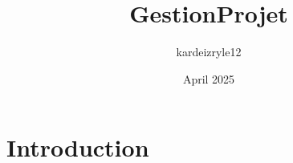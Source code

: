 \documentclass{article}
\title{GestionProjet}
\author{kardeizryle12 }
\date{April 2025}
\begin{document}
\maketitle

\section{Introduction}






\end{document}
